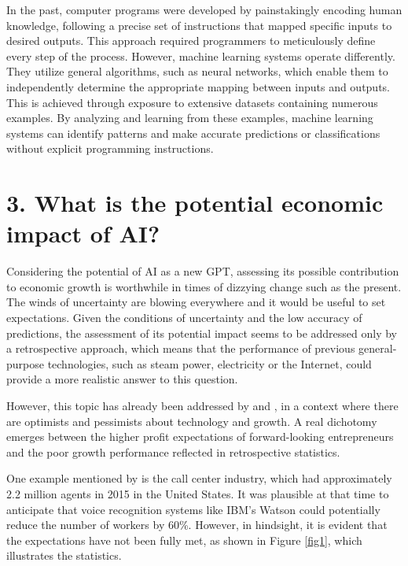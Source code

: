 \documentclass[preprint, 3p,
authoryear]{elsarticle} %
\begin{document}
In the past, computer programs were developed by painstakingly encoding
human knowledge, following a precise set of instructions that mapped
specific inputs to desired outputs. This approach required programmers
to meticulously define every step of the process. However, machine
learning systems operate differently. They utilize general algorithms,
such as neural networks, which enable them to independently determine
the appropriate mapping between inputs and outputs. This is achieved
through exposure to extensive datasets containing numerous examples. By
analyzing and learning from these examples, machine learning systems can
identify patterns and make accurate predictions or classifications
without explicit programming instructions.

\hypertarget{what-is-the-potential-economic-impact-of-ai}{%
\section{3. What is the potential economic impact of
AI?}\label{what-is-the-potential-economic-impact-of-ai}}

Considering the potential of AI as a new GPT, assessing its possible
contribution to economic growth is worthwhile in times of dizzying
change such as the present. The winds of uncertainty are blowing
everywhere and it would be useful to set expectations. Given the
conditions of uncertainty and the low accuracy of predictions, the
assessment of its potential impact seems to be addressed only by a
retrospective approach, which means that the performance of previous
general-purpose technologies, such as steam power, electricity or the
Internet, could provide a more realistic answer to this question.

However, this topic has already been addressed by \citep{paradox} and
\citep{Nicholas}, in a context where there are optimists and pessimists
about technology and growth. A real dichotomy emerges between the higher
profit expectations of forward-looking entrepreneurs and the poor growth
performance reflected in retrospective statistics.

One example mentioned by \citep{paradox} is the call center industry,
which had approximately 2.2 million agents in 2015 in the United States.
It was plausible at that time to anticipate that voice recognition
systems like IBM's Watson could potentially reduce the number of workers
by 60\%. However, in hindsight, it is evident that the expectations have
not been fully met, as shown in Figure \ref{fig1}, which illustrates the
statistics.
\end{document}
